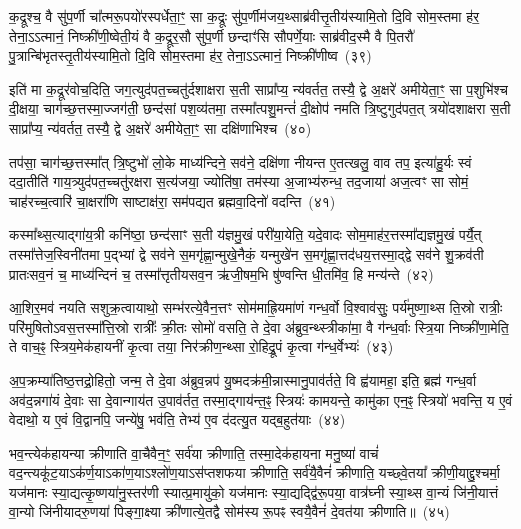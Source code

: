 {\anuvakamend[{प्रज्ञा᳚त्यै पश्यत्यनूया॒जव॒द्यज॑मा॒नो\-ऽनु॑ पुरोनुवा॒क्या᳚स्ता अ॒ष्टौ च॑}]}%

क॒द्रूश्च॒ वै सु॑प॒र्णी चा᳚त्मरू॒पयो॑रस्पर्धेता॒ꣳ॒ सा क॒द्रूः सु॑प॒र्णीम॑जय॒थ्साब्र॑वीत्तृ॒तीय॑स्यामि॒तो दि॒वि सोम॒स्तमा ह॑र॒ तेना॒\-ऽऽ\-त्मानं॒ निष्क्री॑णी॒ष्वेती॒यं वै क॒द्रूर॒सौ सु॑प॒र्णी छन्दाꣳ॑सि सौपर्णे॒याः साब्र॑वीद॒स्मै वै पि॒तरौ॑ पु॒त्रान्बि॑भृतस्तृ॒तीय॑स्यामि॒तो दि॒वि सोम॒स्तमा ह॑र॒ तेना॒\-ऽऽ\-त्मानं॒ निष्क्री॑णीष्व~(३९)

इति॑ मा क॒द्रूर॑वोच॒दिति॒ जग॒त्युद॑पत॒च्चतु॑र्दशाक्षरा स॒ती साप्रा᳚प्य॒ न्य॑वर्तत॒ तस्यै॒ द्वे अ॒क्षरे॑ अमीयेता॒ꣳ॒ सा प॒शुभि॑श्च दी॒क्षया॒ चाग॑च्छ॒त्तस्मा॒ज्जग॑ती॒ छन्द॑सां पश॒व्य॑तमा॒ तस्मा᳚त्पशु॒मन्तं॑ दी॒क्षोप॑ नमति त्रि॒ष्टुगुद॑पत॒त् त्रयो॑दशाक्षरा स॒ती साप्रा᳚प्य॒ न्य॑वर्तत॒ तस्यै॒ द्वे अ॒क्षरे॑ अमीयेता॒ꣳ॒ सा दक्षि॑णाभिश्च~(४०)

तप॑सा॒ चाग॑च्छ॒त्तस्मा᳚त् त्रि॒ष्टुभो॑ लो॒के माध्य॑न्दिने॒ सव॑ने॒ दक्षि॑णा नीयन्त ए॒तत्खलु॒ वाव तप॒ इत्या॑हु॒र्यः स्वं ददा॒तीति॑ गाय॒त्र्युद॑पत॒च्चतु॑रक्षरा स॒त्य॑जया॒ ज्योति॑षा॒ तम॑स्या अ॒जाभ्य॑रुन्ध॒ तद॒जाया॑ अज॒त्वꣳ सा सोमं॒ चाह॑रच्च॒त्वारि॑ चा॒क्षरा॑णि साष्टाक्ष॑रा॒ सम॑पद्यत ब्रह्मवा॒दिनो॑ वदन्ति~(४१)

कस्मा᳚थ्स॒त्याद्गा॑य॒त्री कनि॑ष्ठा॒ छन्द॑साꣳ स॒ती य॑ज्ञमु॒खं परी॑या॒येति॒ यदे॒वादः सोम॒माह॑र॒त्तस्मा᳚द्यज्ञमु॒खं पर्यै॒त् तस्मा᳚त्तेज॒स्विनी॑तमा प॒द्भ्यां द्वे सव॑ने स॒मगृ॑ह्णा॒न्मुखे॒नैकं॒ यन्मुखे॑न स॒मगृ॑ह्णा॒त्तद॑धय॒त्तस्मा॒द्द्वे सव॑ने शु॒क्रव॑ती प्रातःसव॒नं च॒ माध्य॑न्दिनं च॒ तस्मा᳚त्तृतीयसव॒न ऋ॑जी॒षम॒भि षु॑ण्वन्ति धी॒तमि॑व॒ हि मन्य॑न्ते~(४२)

आ॒शिर॒मव॑ नयति सशुक्र॒त्वायाथो॒ सम्भ॑रत्ये॒वैन॒त्तꣳ सोम॑माह्रि॒यमा॑णं गन्ध॒र्वो वि॒श्वाव॑सुः॒ पर्य॑मुष्णा॒थ्स ति॒स्रो रात्रीः॒ परि॑मुषितो\-ऽवस॒त्तस्मा᳚त्ति॒स्रो रात्रीः᳚ क्री॒तः सोमो॑ वसति॒ ते दे॒वा अ॑ब्रुव॒न्थ्स्त्रीका॑मा॒ वै ग॑न्ध॒र्वाः स्त्रि॒या निष्क्री॑णा॒मेति॒ ते वाच॒ꣴ॒ स्त्रिय॒मेक॑हायनीं कृ॒त्वा तया॒ निर॑क्रीण॒न्थ्सा रो॒हिद्रू॒पं कृ॒त्वा ग॑न्ध॒र्वेभ्यः॑~(४३)

अ॒प॒क्रम्या॑तिष्ठ॒त्तद्रो॒हितो॒ जन्म॒ ते दे॒वा अ॑ब्रुव॒न्नप॑ यु॒ष्मदक्र॑मी॒न्नास्मानु॒पाव॑र्तते॒ वि ह्व॑यामहा॒ इति॒ ब्रह्म॑ गन्ध॒र्वा अव॑द॒न्नगा॑यं दे॒वाः सा दे॒वान्गाय॑त उ॒पाव॑र्तत॒ तस्मा॒द्गाय॑न्त॒ꣴ॒ स्त्रियः॑ कामयन्ते॒ कामु॑का एन॒ꣴ॒ स्त्रियो॑ भवन्ति॒ य ए॒वं वेदाथो॒ य ए॒वं वि॒द्वानपि॒ जन्ये॑षु॒ भव॑ति॒ तेभ्य॑ ए॒व द॑दत्यु॒त यद्ब॒हुत॑याः~(४४)

भव॒न्त्येक॑हायन्या क्रीणाति वा॒चैवैन॒ꣳ॒ सर्व॑या क्रीणाति॒ तस्मा॒देक॑हायना मनु॒ष्या॑ वाचं॑ वद॒न्त्यकू॑ट॒या\-ऽक॑र्ण॒या\-ऽका॑ण॒या\-ऽश्लो॑ण॒या\-ऽस॑प्तशफया क्रीणाति॒ सर्व॑यै॒वैनं॑ क्रीणाति॒ यच्छ्वे॒तया᳚ क्रीणी॒याद्दु॒श्चर्मा॒ यज॑मानः स्या॒द्यत्कृ॒ष्णया॑नु॒स्तर॑णी स्यात्प्र॒मायु॑को॒ यज॑मानः स्या॒द्यद्द्वि॑रू॒पया॒ वात्र॑घ्नी स्या॒थ्स वा॒न्यं जि॑नी॒यात्तं वा॒न्यो जि॑नीयादरु॒णया॑ पिङ्गा॒क्ष्या क्री॑णात्ये॒तद्वै सोम॑स्य रू॒पꣴ स्वयै॒वैनं॑ दे॒वत॑या क्रीणाति॥~(४५)

